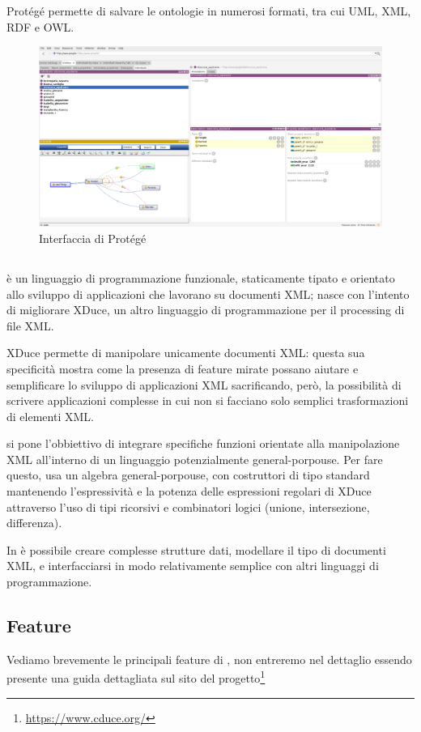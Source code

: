 Protégé permette di salvare le ontologie in numerosi formati, tra cui UML, XML, RDF e OWL.
\begin{figure}[h]
	\centering
	\includegraphics[width=\textwidth]{Picture/interface_protege.png}
	\caption{Interfaccia di Protégé}
\end{figure}
\subsection{\cduce}
\cduce è un linguaggio di programmazione funzionale, staticamente tipato e orientato allo sviluppo di applicazioni che lavorano su documenti XML\cite{cduceLanguage}; nasce con l'intento di migliorare XDuce, un altro linguaggio di programmazione per il processing di file XML\cite{hosoya2003xduce}. 

XDuce permette di manipolare unicamente documenti XML: questa sua specificità mostra come la presenza di feature mirate possano aiutare e semplificare lo sviluppo di applicazioni XML sacrificando, però, la possibilità di scrivere applicazioni complesse in cui non si facciano solo semplici trasformazioni di elementi XML.

\cduce si pone l'obbiettivo di integrare specifiche funzioni orientate alla manipolazione XML all'interno di un linguaggio potenzialmente general-porpouse. Per fare questo, \cduce usa un algebra general-porpouse, con costruttori di tipo standard mantenendo l'espressività e la potenza delle espressioni regolari di XDuce attraverso l'uso di tipi ricorsivi e combinatori logici (unione, intersezione, differenza).

In \cduce è possibile creare complesse strutture dati, modellare il tipo di documenti XML, e interfacciarsi in modo relativamente semplice con altri linguaggi di programmazione\cite{cduceLanguage}.
\subsection{Feature}\label{fature_cduce}
Vediamo brevemente le principali feature di \cduce, non entreremo nel dettaglio essendo presente una guida dettagliata sul sito del progetto\footnote{\url{https://www.cduce.org/}}
